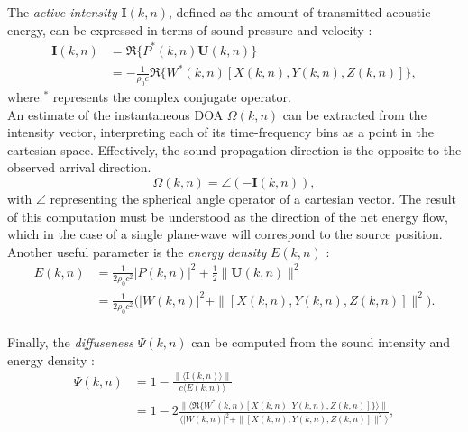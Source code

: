 The \textit{active intensity} $\pmb{I}(k,n)$, defined as the amount of transmitted acoustic energy, can be expressed in terms of sound pressure and velocity \cite{fahy1990sound}:
\begin{equation}
	\begin{aligned}
	\pmb{I}(k,n) &=  \Re\{P^*(k,n)\pmb{U}(k,n)\} \\
	&= - \frac{1}{\rho_0 c}\Re\{W^*(k,n)[X(k,n),Y(k,n),Z(k,n)]\},
	\end{aligned}
\end{equation}
where $^*$ represents the complex conjugate operator. \\

An estimate of the instantaneous DOA $\Omega(k,n)$ can be extracted from the intensity vector, interpreting each of its time-frequency bins as a point in the cartesian space. Effectively, the sound propagation direction is the opposite to the observed arrival direction. 
\begin{equation}
	\Omega(k,n) = \angle(-\pmb{I}(k,n)),
\label{eq:doa}
\end{equation}
with $\angle$ representing the spherical angle operator of a cartesian vector. The result of this computation must be understood as the direction of the net energy flow, which in the case of a single plane-wave will correspond to the source position. \\

Another useful parameter is the \textit{energy density} $E(k,n)$ \cite{stanzial1996reactive}:
\begin{equation}
	\begin{aligned}
		E(k,n) &= \frac{1}{2\rho_0 c^2} |P(k,n)|^2 + \frac{1}{2} {\|\pmb{U}(k,n)\|^2} \\
		&=  \frac{1}{2\rho_0 c^2} \Big(|W(k,n)|^2 + \| [X(k,n), Y(k,n), Z(k,n)] \|^2\Big).
	\end{aligned}
	\label{eq:energydensity}
\end{equation}\\

Finally, the \textit{diffuseness} $\Psi(k,n)$ can be computed from the sound intensity and  energy density \cite{merimaa2005spatial}:
\begin{equation}
	\begin{aligned}
		\Psi(k,n) &= 1 - \frac{ \| \langle \pmb{I}(k,n) \rangle \| }{ c \langle E(k,n) \rangle } \\
		&= 1 - 2\frac{ \| \langle \Re\{W^*(k,n)[X(k,n),Y(k,n),Z(k,n)]\} \rangle \| }{ \langle |W(k,n)|^2 + \| [X(k,n), Y(k,n), Z(k,n)] \|^2 \rangle },
	\end{aligned}
\label{eq:psidefinition}
\end{equation}
 
